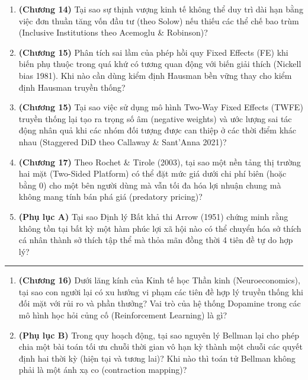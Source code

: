 \documentclass[
]{article}
\providecommand{\tightlist}{%
  \setlength{\itemsep}{0pt}\setlength{\parskip}{0pt}}
\begin{document}
\begin{enumerate}
  ngăn cản nhóm năng suất cao hưởng địa tô thông tin?
\item
  \textbf{(Chương 14)} Tại sao sự thịnh vượng kinh tế không thể duy trì
  dài hạn bằng việc đơn thuần tăng vốn đầu tư (theo Solow) nếu thiếu các
  thể chế bao trùm (Inclusive Institutions theo Acemoglu \& Robinson)?
\item
  \textbf{(Chương 15)} Phân tích sai lầm của phép hồi quy Fixed Effects
  (FE) khi biến phụ thuộc trong quá khứ có tương quan động với biến giải
  thích (Nickell bias 1981). Khi nào cần dùng kiểm định Hausman bền vững
  thay cho kiểm định Hausman truyền thống?
\item
  \textbf{(Chương 15)} Tại sao việc sử dụng mô hình Two-Way Fixed
  Effects (TWFE) truyền thống lại tạo ra trọng số âm (negative weights)
  và ước lượng sai tác động nhân quả khi các nhóm đối tượng được can
  thiệp ở các thời điểm khác nhau (Staggered DiD theo Callaway \&
  Sant'Anna 2021)?
\item
  \textbf{(Chương 17)} Theo Rochet \& Tirole (2003), tại sao một nền
  tảng thị trường hai mặt (Two-Sided Platform) có thể đặt mức giá dưới
  chi phí biên (hoặc bằng 0) cho một bên người dùng mà vẫn tối đa hóa
  lợi nhuận chung mà không mang tính bán phá giá (predatory pricing)?
\item
  \textbf{(Phụ lục A)} Tại sao Định lý Bất khả thi Arrow (1951) chứng
  minh rằng không tồn tại bất kỳ một hàm phúc lợi xã hội nào có thể
  chuyển hóa sở thích cá nhân thành sở thích tập thể mà thỏa mãn đồng
  thời 4 tiên đề tự do hợp lý?
\end{enumerate}

\begin{center}\rule{0.5\linewidth}{0.5pt}\end{center}

\begin{enumerate}
\def\labelenumi{\arabic{enumi}.}
\setcounter{enumi}{15}
\tightlist
\item
  \textbf{(Chương 16)} Dưới lăng kính của Kinh tế học Thần kinh
  (Neuroeconomics), tại sao con người lại có xu hướng vi phạm các tiên
  đề hợp lý truyền thống khi đối mặt với rủi ro và phần thưởng? Vai trò
  của hệ thống Dopamine trong các mô hình học hỏi củng cố (Reinforcement
  Learning) là gì?
\item
  \textbf{(Phụ lục B)} Trong quy hoạch động, tại sao nguyên lý Bellman
  lại cho phép chia một bài toán tối ưu chuỗi thời gian vô hạn kỳ thành
  một chuỗi các quyết định hai thời kỳ (hiện tại và tương lai)? Khi nào
  thì toán tử Bellman không phải là một ánh xạ co (contraction mapping)?
\end{enumerate}
\end{document}
